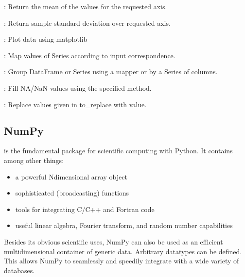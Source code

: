 \documentclass[letterpaper,10pt,english]{sphinxmanual}
\begin{document}
: Return the mean of the values for the requested axis.

: Return sample standard deviation over requested axis.

: Plot data using matplotlib

: Map values of Series according to input correspondence.

: Group DataFrame or Series using a mapper or by a Series of columns.

: Fill NA/NaN values using the specified method.

: Replace values given in to\_replace with value.


\subsection{NumPy}
\label{\detokenize{content/Glossary:numpy}}
 is the fundamental package for scientific computing with Python. It contains among other things:
\begin{itemize}
\item {} 
a powerful N\sphinxhyphen{}dimensional array object

\item {} 
sophisticated (broadcasting) functions

\item {} 
tools for integrating C/C++ and Fortran code

\item {} 
useful linear algebra, Fourier transform, and random number capabilities

\end{itemize}

Besides its obvious scientific uses, NumPy can also be used as an efficient multi\sphinxhyphen{}dimensional container of generic data. Arbitrary data\sphinxhyphen{}types can be defined. This allows NumPy to seamlessly and speedily integrate with a wide variety of databases.
\end{document}
